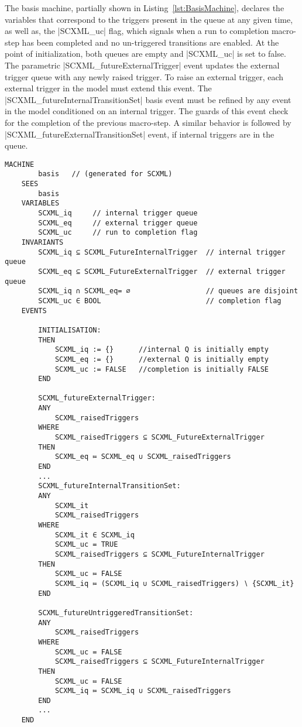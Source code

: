 The basis machine, partially shown in Listing~\ref{lst:BasisMachine}, declares the variables that correspond to the triggers present in the queue at any given time, as well as, the |SCXML_uc| flag, which signals when a run to completion macro-step has been completed and no un-triggered transitions are enabled. 
At the point of initialization, both queues are empty and |SCXML_uc| is set to false. 
The parametric |SCXML_futureExternalTrigger| event updates the external trigger queue with any newly raised trigger. 
To raise an external trigger, each external trigger in the model must extend this event. 
The |SCXML_futureInternalTransitionSet| basis event must be refined by any event in the model conditioned on an internal trigger. 
The guards of this event check for the completion of the previous macro-step. 
A similar behavior is followed by |SCXML_futureExternalTransitionSet| event, if internal triggers are in the queue.  


\begin{lstlisting}[caption={Snippet of abstract basis machine}, label={lst:BasisMachine},language=Event-B, escapechar=|, frame=single]
MACHINE
		basis 	// (generated for SCXML)
	SEES
		basis 
	VARIABLES
		SCXML_iq	 // internal trigger queue
		SCXML_eq	 // external trigger queue
		SCXML_uc	 // run to completion flag
	INVARIANTS
		SCXML_iq ⊆ SCXML_FutureInternalTrigger	// internal trigger queue
		SCXML_eq ⊆ SCXML_FutureExternalTrigger	// external trigger queue
		SCXML_iq ∩ SCXML_eq= ∅					// queues are disjoint
		SCXML_uc ∈ BOOL							// completion flag
	EVENTS
	
		INITIALISATION: 
		THEN
			SCXML_iq := {}		//internal Q is initially empty
			SCXML_eq := {}		//external Q is initially empty
			SCXML_uc := FALSE	//completion is initially FALSE
		END

		SCXML_futureExternalTrigger: 
		ANY
			SCXML_raisedTriggers	 
		WHERE
			SCXML_raisedTriggers ⊆ SCXML_FutureExternalTrigger 
		THEN
			SCXML_eq ≔ SCXML_eq ∪ SCXML_raisedTriggers 
		END
        ...
		SCXML_futureInternalTransitionSet: 
		ANY
			SCXML_it	 
			SCXML_raisedTriggers	 
		WHERE
			SCXML_it ∈ SCXML_iq 
			SCXML_uc = TRUE 
			SCXML_raisedTriggers ⊆ SCXML_FutureInternalTrigger 
		THEN
			SCXML_uc ≔ FALSE 
			SCXML_iq ≔ (SCXML_iq ∪ SCXML_raisedTriggers) ∖ {SCXML_it} 
		END

		SCXML_futureUntriggeredTransitionSet: 
		ANY
			SCXML_raisedTriggers	 
		WHERE
			SCXML_uc = FALSE
			SCXML_raisedTriggers ⊆ SCXML_FutureInternalTrigger
		THEN
			SCXML_uc ≔ FALSE 
			SCXML_iq ≔ SCXML_iq ∪ SCXML_raisedTriggers 
		END
        ...
	END
\end{lstlisting}

